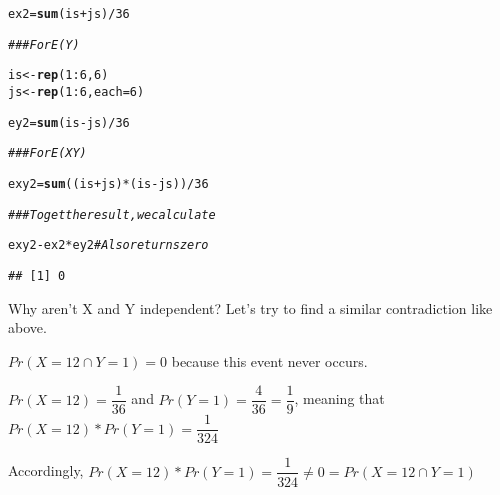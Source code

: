 \documentclass[12pt,letter]{article}\usepackage[]{graphicx}\usepackage[]{color}
\makeatletter
\newcommand{\hlnum}[1]{\textcolor[rgb]{0.686,0.059,0.569}{#1}}%
\newcommand{\hlcom}[1]{\textcolor[rgb]{0.678,0.584,0.686}{\textit{#1}}}%
\newcommand{\hlopt}[1]{\textcolor[rgb]{0,0,0}{#1}}%
\newcommand{\hlstd}[1]{\textcolor[rgb]{0.345,0.345,0.345}{#1}}%
\newcommand{\hlkwb}[1]{\textcolor[rgb]{0.69,0.353,0.396}{#1}}%
\newcommand{\hlkwc}[1]{\textcolor[rgb]{0.333,0.667,0.333}{#1}}%
\newcommand{\hlkwd}[1]{\textcolor[rgb]{0.737,0.353,0.396}{\textbf{#1}}}%
\newenvironment{kframe}{%
 \def\at@end@of@kframe{}%
 \ifinner\ifhmode%
  \def\at@end@of@kframe{\end{minipage}}%
  \begin{minipage}{\columnwidth}%
 \fi\fi%
 \def\FrameCommand##1{\hskip\@totalleftmargin \hskip-\fboxsep
 \colorbox{shadecolor}{##1}\hskip-\fboxsep
     \hskip-\linewidth \hskip-\@totalleftmargin \hskip\columnwidth}%
 \MakeFramed {\advance\hsize-\width
   \@totalleftmargin\z@ \linewidth\hsize
   \@setminipage}}%
 {\par\unskip\endMakeFramed%
 \at@end@of@kframe}
\newenvironment{knitrout}{}{} %
\makeatother
\begin{document}
\begin{knitrout}
\begin{kframe}
\begin{alltt}
\hlstd{ex2} \hlkwb{=} \hlkwd{sum}\hlstd{(is} \hlopt{+} \hlstd{js)}\hlopt{/}\hlnum{36}

\hlcom{### For E(Y)}

\hlstd{is} \hlkwb{<-} \hlkwd{rep}\hlstd{(}\hlnum{1}\hlopt{:}\hlnum{6}\hlstd{,} \hlnum{6}\hlstd{)}
\hlstd{js} \hlkwb{<-} \hlkwd{rep}\hlstd{(}\hlnum{1}\hlopt{:}\hlnum{6}\hlstd{,} \hlkwc{each} \hlstd{=} \hlnum{6}\hlstd{)}

\hlstd{ey2} \hlkwb{=} \hlkwd{sum}\hlstd{(is} \hlopt{-} \hlstd{js)}\hlopt{/}\hlnum{36}

\hlcom{### For E(XY)}

\hlstd{exy2} \hlkwb{=} \hlkwd{sum}\hlstd{((is} \hlopt{+} \hlstd{js)} \hlopt{*} \hlstd{(is} \hlopt{-} \hlstd{js))}\hlopt{/}\hlnum{36}

\hlcom{### To get the result, we calculate}

\hlstd{exy2} \hlopt{-} \hlstd{ex2} \hlopt{*} \hlstd{ey2}  \hlcom{# Also returns zero}
\end{alltt}
\begin{verbatim}
## [1] 0
\end{verbatim}
\end{kframe}
\end{knitrout}

Why aren't X and Y independent? Let's try to find a similar contradiction like above.

$Pr (X=12 \cap Y=1) = 0$ because this event never occurs.

$Pr (X=12) = \dfrac{1}{36}$ and $Pr (Y=1) = \dfrac{4}{36} = \dfrac{1}{9}$, meaning that $Pr (X=12)*Pr(Y=1) = \dfrac{1}{324}$

Accordingly, $Pr (X=12)*Pr(Y=1) = \dfrac{1}{324} \neq 0 = Pr (X=12 \cap Y=1)$
\end{document}
